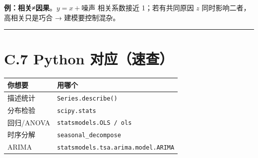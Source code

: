 \textbf{例：相关≠因果}。\(y=x+\text{噪声}\) 相关系数接近 1；若有共同原因
\(z\) 同时影响二者，高相关只是巧合 → 建模要控制混杂。

\begin{center}\rule{0.5\linewidth}{0.5pt}\end{center}

\section{C.7 Python
对应（速查）}\label{c.7-python-ux5bf9ux5e94ux901fux67e5}

\begin{Shaded}
\begin{Highlighting}[]

\OperatorTok{=}\NormalTok{ np.array([}\NormalTok{, }\NormalTok{, }\NormalTok{, }\NormalTok{, }\NormalTok{])}
\NormalTok{)}
\NormalTok{stats.chisquare([}\NormalTok{, }\NormalTok{, }\NormalTok{])}

\OperatorTok{=}\NormalTok{ sm.add\_constant(np.array([[}\NormalTok{,}\NormalTok{],[}\NormalTok{,}\NormalTok{],[}\NormalTok{,}\NormalTok{]]))}
\OperatorTok{=}\NormalTok{ sm.OLS(np.array([}\NormalTok{,}\NormalTok{,}\NormalTok{]), X).fit()}

\OperatorTok{=}\OperatorTok{=}\OperatorTok{=}\NormalTok{)}
\NormalTok{seasonal\_decompose(df[}\NormalTok{], model}\OperatorTok{=}
\end{Highlighting}
\end{Shaded}

{\def\LTcaptype{none} %
\begin{longtable}[]{@{}ll@{}}
\toprule\noalign{}
你想要 & 用哪个 \\
\midrule\noalign{}
\endhead
\bottomrule\noalign{}
\endlastfoot
描述统计 & \texttt{Series.describe()} \\
分布检验 & \texttt{scipy.stats} \\
回归/ANOVA & \texttt{statsmodels.OLS\ /\ ols} \\
时序分解 & \texttt{seasonal\_decompose} \\
ARIMA & \texttt{statsmodels.tsa.arima.model.ARIMA} \\
\end{longtable}
}

